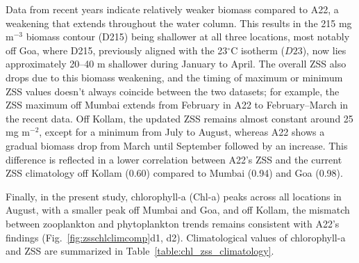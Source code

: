 \documentclass[12pt,a4paper]{article}
\begin{document}
Data from recent years indicate relatively weaker biomass compared to A22, a weakening that extends throughout the water column. This results in the 215 mg m$^{-3}$ biomass contour (D215) being shallower at all three locations, most notably off Goa, where D215, previously aligned with the 23$^\circ$C isotherm ($D23$), now lies approximately 20–40 m shallower during January to April. The overall ZSS also drops due to this biomass weakening, and the timing of maximum or minimum ZSS values doesn't always coincide between the two datasets; for example, the ZSS maximum off Mumbai extends from February in A22 to February–March in the recent data. Off Kollam, the updated ZSS remains almost constant around 25 mg m$^{-2}$, except for a minimum from July to August, whereas A22 shows a gradual biomass drop from March until September followed by an increase. This difference is reflected in a lower correlation between A22's ZSS and the current ZSS climatology off Kollam (0.60) compared to Mumbai (0.94) and Goa (0.98).

Finally, in the present study, chlorophyll-a (Chl-a) peaks across all locations in August, with a smaller peak off Mumbai and Goa, and off Kollam, the mismatch between zooplankton and phytoplankton trends remains consistent with A22's findings (Fig.~\ref{fig:zsschlclimcomp}d1, d2). Climatological values of chlorophyll-a and ZSS are summarized in Table~\ref{table:chl_zss_climatology}.

 
	
\end{document}
